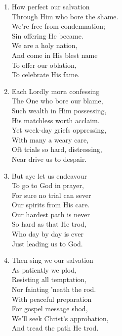 \begin{enumerate}
    \item How perfect our salvation \\
        Through Him who bore the shame. \\
        We're free from condemnation; \\
        Sin offering He became. \\
        We are a holy nation, \\
        And come in His blest name \\
        To offer our oblation, \\
        To celebrate His fame.

    \item Each Lordly morn confessing \\
        The One who bore our blame, \\
        Such wealth in Him possessing, \\
        His matchless worth acclaim. \\
        Yet week-day griefs oppressing, \\
        With many a weary care, \\
        Oft trials so hard, distressing, \\
        Near drive us to despair.

    \item But aye let us endeavour \\
        To go to God in prayer, \\
        For sure no trial can sever \\
        Our spirits from His care. \\
        Our hardest path is never \\
        So hard as that He trod, \\
        Who day by day is ever \\
        Just leading us to God.

    \item Then sing we our salvation \\
        As patiently we plod, \\
        Resisting all temptation, \\
        Nor fainting 'neath the rod. \\
        With peaceful preparation \\
        For gospel message shod, \\
        We'll seek Christ's approbation, \\
        And tread the path He trod.

\end{enumerate}

